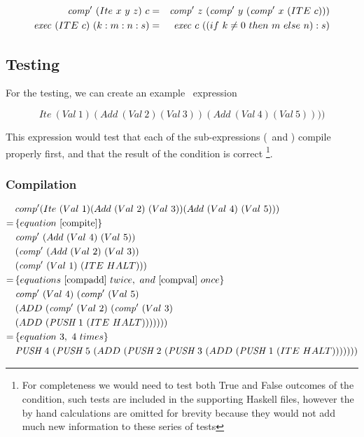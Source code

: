 \documentclass {article}
\begin{document}
\begin{eqnarray}
	\Compp  (Ite\ x\ y\ z)\ c &=&  \Compp  z\ (\Compp  y\ (\Compp  x\ (ITE\ c))) \label{compite}\\
	\Exec (ITE\ c)\ (k:m:n:s) &=& \Exec c\ ((if\ k \not= 0\ then\ m\ else\ n):s) \label{execite}
\end{eqnarray}

\subsection{Testing}

For the testing, we can create an example \ite\ expression

	\[Ite\ (Val\ 1) (Add\ (Val\ 2) (Val\ 3)) (Add\ (Val\ 4) (Val\ 5)))) \]

This expression would test that
each of the sub-expressions 
(\add\ and \val) compile properly first, 
and that the result of the condition is correct
\footnote{
For completeness we would need to 
test both True and False outcomes of the condition,
such tests are included in the supporting Haskell files, 
however the by hand calculations are omitted
for brevity because they would not add much new
information to these series of tests}.

\subsubsection{Compilation}

\begin{align*}
	&comp' (Ite\
			(Val\ 1)
			(Add\ (Val\ 2)\ (Val\ 3))
			(Add\ (Val\ 4)\ (Val\ 5))) \\
	=\, & \{ equation\ \ref{compite} \}\ \\ 
	&\Compp  (Add\ (Val\ 4)\ (Val\ 5))\\
		&(\Compp  (Add\ (Val\ 2)\ (Val\ 3))\\
			&(\Compp  (Val\ 1)\ (ITE\  HALT))) \\
	=\, & \{ equations\ \ref{compadd}\ twice,\ and\ \ref{compval}\ once\} \\
	&\Compp  (Val\ 4)\ 
		(\Compp  (Val\ 5)\ \\
				&(ADD\ (\Compp  (Val\ 2)\ 
						(\Compp  (Val\ 3)\ \\
							&(ADD\ (\PUSH 1\ 
								(ITE\ HALT))))))) \\
	=\, & \{equation\ 3,\ 4\ times \} \\
	&\PUSH 4\ (\PUSH 5\ 
		(ADD\ (\PUSH 2\ (\PUSH 3\ 
			(ADD\ (\PUSH 1\ (ITE\ HALT)))))))
\end{align*}
\end{document}
